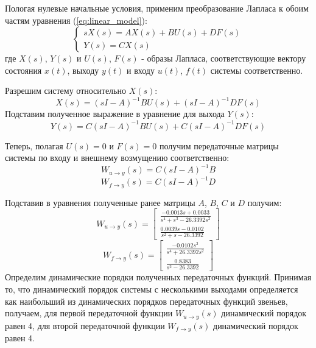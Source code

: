 Пологая нулевые начальные условия, применим преобразование Лапласа к обоим частям уравнения (\ref{eq:linear_model}): 
\begin{equation}
    \begin{cases}
        sX(s) = AX(s) + BU(s) + DF(s) \\ 
        Y(s) = CX(s)
    \end{cases}
\end{equation}
где $X(s)$, $Y(s)$ и $U(s)$, $F(s)$ - образы Лапласа, соответствующие вектору состояния $x(t)$, выходу $y(t)$ и входу $u(t)$, $f(t)$ системы соответственно.

Разрешим систему относительно $X(s)$:
\begin{equation}
    X(s) = (sI - A)^{-1}BU(s) + (sI - A)^{-1}DF(s)
\end{equation}
Подставим полученное выражение в уравнение для выхода $Y(s)$:
\begin{equation}
    Y(s) = C(sI - A)^{-1}BU(s) + C(sI - A)^{-1}DF(s)
\end{equation}

Теперь, полагая $U(s) = 0$ и $F(s) = 0$ получим передаточные матрицы системы по входу и внешнему возмущению соответственно:
\begin{equation}
    W_{u\rightarrow y}(s) = C(sI - A)^{-1}B
\end{equation}
\begin{equation}
    W_{f\rightarrow y}(s) = C(sI - A)^{-1}D
\end{equation}

Подставив в уравнения полученные ранее матрицы $A$, $B$, $C$ и $D$ получим: 
\begin{equation}
    W_{u \rightarrow y}(s) = \begin{bmatrix}
    \frac{ -0.0013s + 0.0033}{s^4 + s^3 - 26.3392s^2} \\ 
    \frac{0.0039s - 0.0102}{s^2 + s - 26.3392}
    \end{bmatrix}
\end{equation}
\begin{equation}
    W_{f \rightarrow y}(s) = \begin{bmatrix}
    \frac{-0.0102s^2}{s^4 + 26.3392s^2} \\ 
    \frac{0.8383}{s^2 - 26.3392}
    \end{bmatrix}
\end{equation}
Определим динамические порядки полученных передаточных функций. 
Принимая то, что динамический порядок системы с несколькими выходами определяется как 
наибольший из динамических порядков передаточных функций звеньев, получаем, 
для первой передаточной функции $W_{u \rightarrow y}(s)$ динамический порядок равен 4, 
для второй передаточной функции $W_{f \rightarrow y}(s)$ динамический порядок равен 4. 

